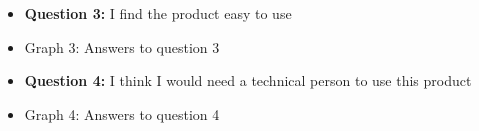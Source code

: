 \documentclass{article}
\begin{document}
\begin{itemize}
		\item[] \textbf{Question 3:} I find the product easy to use
		\item[] \begin{minipage}[t]{\linewidth}
         	 \raggedright
          	\medskip
          	\centerline{Graph 3: Answers to question 3}
          \end{minipage}
\end{itemize}
\begin{itemize}
		\item[] \textbf{Question 4:} I think I would need a technical person to use this product
		\item[] \begin{minipage}[t]{\linewidth}
         	 \raggedright
          	\medskip
          	\centerline{Graph 4: Answers to question 4}
          \end{minipage}
\end{itemize}
\end{document}
